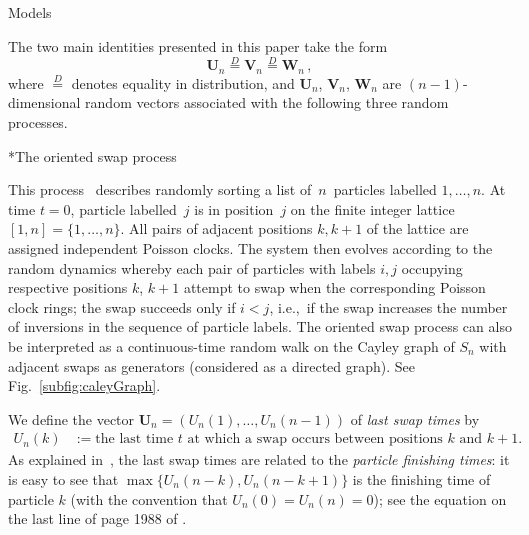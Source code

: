 \documentclass[a4paper,reqno,12pt]{amsart}
\makeatletter
\theoremstyle{plain}
\theoremstyle{definition}
\renewcommand\subsection{\@startsection{subsection}{2}%
  \z@{.5\linespacing\@plus.7\linespacing}{-.5em}%
  {\bfseries\scshape}}
\renewcommand\subsubsection{\@startsection{subsubsection}{3}%
  \z@{.5\linespacing\@plus.7\linespacing}{-.5em}%
  {\scshape}}
\newcommand{\firstmention}{\emph}
\newcommand{\1}{\mathbbm{1}}
\makeatother
\begin{document}
\subsection{Models}
\label{subsec:models}

The two main identities presented in this paper take the form 
\[
\bm{U}_n \overset{D}{=} \bm{V}_n \overset{D}{=}
\bm{W}_n \, ,
\]
where $ \overset{D}{=}$ denotes equality in distribution, and $\bm{U}_n$, $\bm{V}_n$, $\bm{W}_n$ are $(n-1)$-dimensional random vectors associated with the following three random processes.

\subsubsection*{The oriented swap process}

This process~\cite{angelHolroydRomik09} describes randomly sorting a list of~$n$~particles labelled $1,\ldots,n$.
At time $t=0$, particle labelled~$j$ is in position~$j$ on the finite integer lattice $[1,n]=\{1,\ldots,n\}$.
All pairs of adjacent positions $k,k+1$ of the lattice are assigned independent Poisson clocks.
The system then evolves according to the random dynamics whereby each pair of particles with labels $i,j$ occupying respective positions $k$, $k+1$ attempt to swap when the corresponding Poisson clock rings; the swap succeeds only if $i<j$, i.e.,\ if the swap increases the number of inversions in the sequence of particle labels.
The oriented swap process can also be interpreted as a continuous-time random walk on the Cayley graph of $S_n$ with adjacent swaps as generators (considered as a directed graph).
See Fig.~\ref{subfig:caleyGraph}.

We define the vector $\bm{U}_n = (U_n(1), \ldots, U_n(n-1))$ of \firstmention{last swap times} by
\begin{align*}
U_n(k) &:= \text{the last time $t$ at which a swap occurs between positions $k$ and $k+1$}.
\end{align*}
As explained in~\cite{angelHolroydRomik09}, the last swap times are related to the \firstmention{particle finishing times}: it is easy to see that $\max\{U_n(n-k), U_n(n-k+1)\}$ is the finishing time of particle $k$ (with the convention that $U_n(0)=U_n(n)=0$); see the equation on the last line of page 1988 of \cite{angelHolroydRomik09}.
\end{document}
